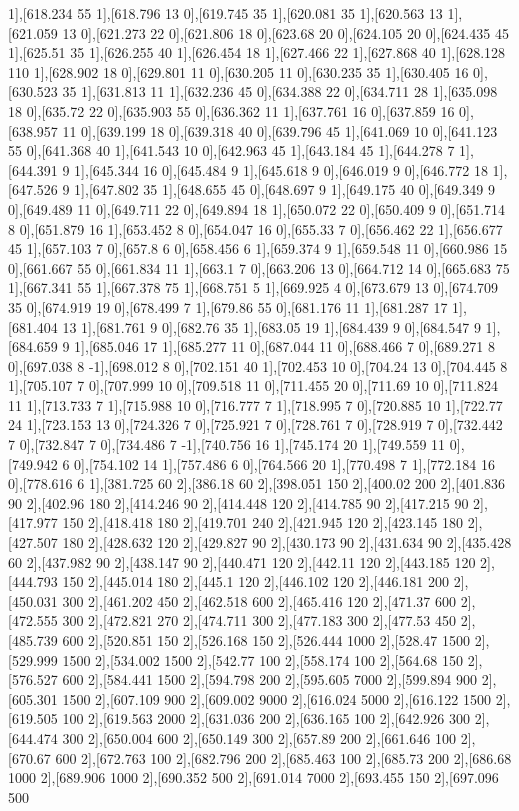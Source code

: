 {1],[618.234 55 1],[618.796 13 0],[619.745 35 1],[620.081 35 1],[620.563 13 1],[621.059 13 0],[621.273 22 0],[621.806 18 0],[623.68 20 0],[624.105 20 0],[624.435 45 1],[625.51 35 1],[626.255 40 1],[626.454 18 1],[627.466 22 1],[627.868 40 1],[628.128 110 1],[628.902 18 0],[629.801 11 0],[630.205 11 0],[630.235 35 1],[630.405 16 0],[630.523 35 1],[631.813 11 1],[632.236 45 0],[634.388 22 0],[634.711 28 1],[635.098 18 0],[635.72 22 0],[635.903 55 0],[636.362 11 1],[637.761 16 0],[637.859 16 0],[638.957 11 0],[639.199 18 0],[639.318 40 0],[639.796 45 1],[641.069 10 0],[641.123 55 0],[641.368 40 1],[641.543 10 0],[642.963 45 1],[643.184 45 1],[644.278 7 1],[644.391 9 1],[645.344 16 0],[645.484 9 1],[645.618 9 0],[646.019 9 0],[646.772 18 1],[647.526 9 1],[647.802 35 1],[648.655 45 0],[648.697 9 1],[649.175 40 0],[649.349 9 0],[649.489 11 0],[649.711 22 0],[649.894 18 1],[650.072 22 0],[650.409 9 0],[651.714 8 0],[651.879 16 1],[653.452 8 0],[654.047 16 0],[655.33 7 0],[656.462 22 1],[656.677 45 1],[657.103 7 0],[657.8 6 0],[658.456 6 1],[659.374 9 1],[659.548 11 0],[660.986 15 0],[661.667 55 0],[661.834 11 1],[663.1 7 0],[663.206 13 0],[664.712 14 0],[665.683 75 1],[667.341 55 1],[667.378 75 1],[668.751 5 1],[669.925 4 0],[673.679 13 0],[674.709 35 0],[674.919 19 0],[678.499 7 1],[679.86 55 0],[681.176 11 1],[681.287 17 1],[681.404 13 1],[681.761 9 0],[682.76 35 1],[683.05 19 1],[684.439 9 0],[684.547 9 1],[684.659 9 1],[685.046 17 1],[685.277 11 0],[687.044 11 0],[688.466 7 0],[689.271 8 0],[697.038 8 -1],[698.012 8 0],[702.151 40 1],[702.453 10 0],[704.24 13 0],[704.445 8 1],[705.107 7 0],[707.999 10 0],[709.518 11 0],[711.455 20 0],[711.69 10 0],[711.824 11 1],[713.733 7 1],[715.988 10 0],[716.777 7 1],[718.995 7 0],[720.885 10 1],[722.77 24 1],[723.153 13 0],[724.326 7 0],[725.921 7 0],[728.761 7 0],[728.919 7 0],[732.442 7 0],[732.847 7 0],[734.486 7 -1],[740.756 16 1],[745.174 20 1],[749.559 11 0],[749.942 6 0],[754.102 14 1],[757.486 6 0],[764.566 20 1],[770.498 7 1],[772.184 16 0],[778.616 6 1],[381.725 60 2],[386.18 60 2],[398.051 150 2],[400.02 200 2],[401.836 90 2],[402.96 180 2],[414.246 90 2],[414.448 120 2],[414.785 90 2],[417.215 90 2],[417.977 150 2],[418.418 180 2],[419.701 240 2],[421.945 120 2],[423.145 180 2],[427.507 180 2],[428.632 120 2],[429.827 90 2],[430.173 90 2],[431.634 90 2],[435.428 60 2],[437.982 90 2],[438.147 90 2],[440.471 120 2],[442.11 120 2],[443.185 120 2],[444.793 150 2],[445.014 180 2],[445.1 120 2],[446.102 120 2],[446.181 200 2],[450.031 300 2],[461.202 450 2],[462.518 600 2],[465.416 120 2],[471.37 600 2],[472.555 300 2],[472.821 270 2],[474.711 300 2],[477.183 300 2],[477.53 450 2],[485.739 600 2],[520.851 150 2],[526.168 150 2],[526.444 1000 2],[528.47 1500 2],[529.999 1500 2],[534.002 1500 2],[542.77 100 2],[558.174 100 2],[564.68 150 2],[576.527 600 2],[584.441 1500 2],[594.798 200 2],[595.605 7000 2],[599.894 900 2],[605.301 1500 2],[607.109 900 2],[609.002 9000 2],[616.024 5000 2],[616.122 1500 2],[619.505 100 2],[619.563 2000 2],[631.036 200 2],[636.165 100 2],[642.926 300 2],[644.474 300 2],[650.004 600 2],[650.149 300 2],[657.89 200 2],[661.646 100 2],[670.67 600 2],[672.763 100 2],[682.796 200 2],[685.463 100 2],[685.73 200 2],[686.68 1000 2],[689.906 1000 2],[690.352 500 2],[691.014 7000 2],[693.455 150 2],[697.096 500 }
